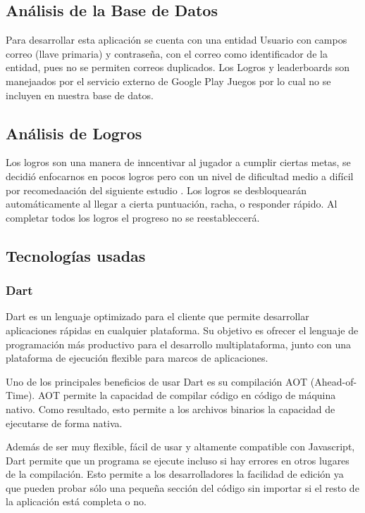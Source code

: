 \documentclass{article}
\begin{document}
\subsection{Análisis de la Base de Datos}%
Para desarrollar esta aplicación se cuenta con una entidad Usuario con campos correo (llave primaria) y contraseña, con el correo como identificador de la entidad, pues no se permiten correos duplicados. Los Logros y leaderboards son manejaados por el servicio externo de Google Play Juegos por lo cual no se incluyen en nuestra base de datos.

\subsection{Análisis de Logros}
Los logros son una manera de inncentivar al jugador a cumplir ciertas metas, se decidió enfocarnos en pocos logros pero con un nivel de dificultad medio a difícil por recomedaación del siguiente estudio \cite{groening2019achievement}.
Los logros se desbloquearán automáticamente al llegar a cierta puntuación, racha, o  responder rápido. Al completar todos los logros el progreso no se reestableccerá. 


\subsection{Tecnologías usadas}
\subsubsection{Dart}
Dart es un lenguaje optimizado para el cliente que permite desarrollar 
aplicaciones rápidas en cualquier plataforma. Su objetivo es ofrecer el 
lenguaje de programación más productivo para el desarrollo multiplataforma, 
junto con una plataforma de ejecución flexible para marcos de aplicaciones.

Uno de los principales beneficios de usar Dart es su compilación AOT 
(Ahead-of-Time). AOT permite la capacidad de compilar código en código de 
máquina nativo. Como resultado, esto permite a los archivos binarios la 
capacidad de ejecutarse de forma nativa.

Además de ser muy flexible, fácil de usar y altamente compatible con Javascript, 
Dart permite que un programa se ejecute incluso si hay errores en otros lugares 
de la compilación. Esto permite a los desarrolladores la facilidad de edición 
ya que pueden probar sólo una pequeña sección del código sin importar si el 
resto de la aplicación está completa o no. 
\end{document}
